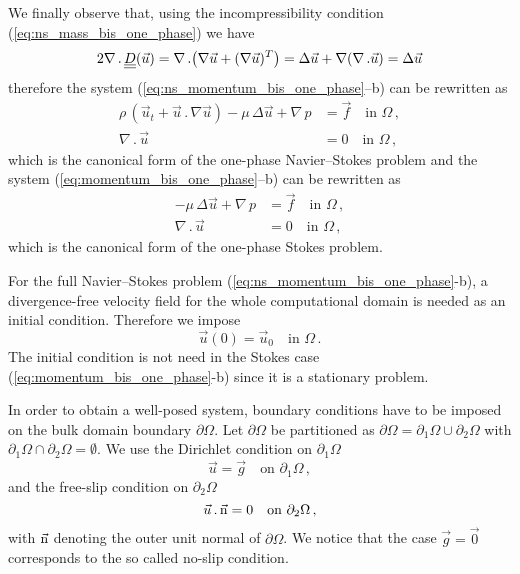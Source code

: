 We finally observe that, using the incompressibility condition
(\ref{eq:ns_mass_bis_one_phase}) we have
\begin{equation}
2\nabla\,.\,\mat D(\vec u) = \nabla\,.\big(\nabla\vec u+(\nabla\vec u)^T\big)=
\Delta \vec u + \nabla(\nabla\,.\vec u) = \Delta \vec u
\end{equation}
therefore the system (\ref{eq:ns_momentum_bis_one_phase}--b) can be rewritten as
\begin{subequations}
\begin{alignat}{2}
\rho\,(\vec u_t +\vec u \,.\, \nabla \vec u) - \mu\,\Delta\vec u+\nabla\,p
& = \vec f \quad \mbox{in } \Omega\,, \\
\nabla\,.\,\vec u & = 0 \quad \mbox{in } \Omega\,,
\end{alignat}
\end{subequations}
which is the canonical form of the one-phase Navier--Stokes problem and the
system (\ref{eq:momentum_bis_one_phase}--b) can be rewritten as
\begin{subequations}
\begin{alignat}{2}
- \mu\,\Delta\vec u+\nabla\,p & = \vec f \quad \mbox{in } \Omega\,, \\
\nabla\,.\,\vec u & = 0 \quad \mbox{in } \Omega\,,
\end{alignat}
\end{subequations}
which is the canonical form of the one-phase Stokes problem.

For the full Navier--Stokes problem (\ref{eq:ns_momentum_bis_one_phase}-b), a
divergence-free velocity field for the whole computational domain is needed as
an initial condition. Therefore we impose
\begin{equation}\label{eq:ns_ic}
\vec u(0) = \vec u_0 \quad \mbox{in } \Omega\,.
\end{equation}
The initial condition is not need in the Stokes case
(\ref{eq:momentum_bis_one_phase}-b) since it is a stationary problem.

In order to obtain a well-posed system, boundary conditions have to be imposed
on the bulk domain boundary $\partial\Omega$. Let $\partial\Omega$ be
partitioned as $\partial\Omega=\partial_1\Omega \cup \partial_2\Omega$ with
$\partial_1\Omega \cap \partial_2\Omega = \emptyset$. We use the Dirichlet
condition on $\partial_1 \Omega$
\begin{equation}\label{eq:ns_bc_dirichlet}
\vec u = \vec g \quad \mbox{on } \partial_1 \Omega\,,
\end{equation}
and the free-slip condition on $\partial_2 \Omega$
\begin{equation}\label{eq:ns_bc_freeslip}
\vec u \,.\,\vec{\rm n} = 0  \quad \mbox{on } \partial_2 \Omega\,,
\end{equation}
with $\vec{\rm n}$ denoting the outer unit normal of $\partial \Omega$. We notice
that the case $\vec g = \vec 0$ corresponds to the so called no-slip condition.

